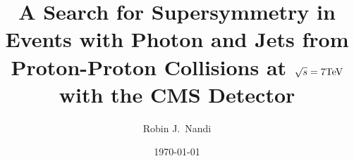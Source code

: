 \documentclass[a4paper]{report}
\begin{document}
\title{A Search for Supersymmetry in Events with Photon and Jets from 
Proton-Proton Collisions at $\sqrt{s} = 7 \mbox{TeV}$ with the CMS Detector}
\author{Robin J.\ Nandi}
\date{\today}

\maketitle

\tableofcontents



















%
\end{document}
